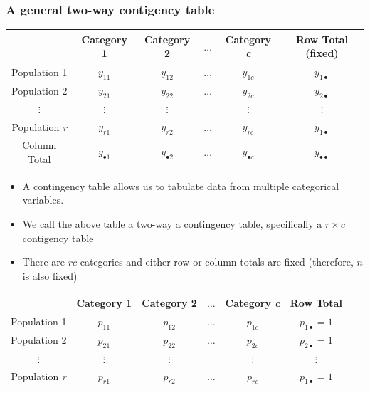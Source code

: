 \documentclass[a4paper]{article}
\begin{document}
\subsubsection{A general two-way contigency table}
\begin{table}[H]
	\centering
	\begin{tabular}{@{}cccccc@{}}
	\toprule
				 		  & Category 1   		& Category 2   		  & \( \dots \) & Category \textit{c} & Row Total (fixed)        \\ \midrule
	Population 1 		  & \( y_{11} \) 		& \( y_{12} \) 		  & \( \dots \) & \( y_{1c} \)        & \( y_{1 \bullet} \)      \\
	Population 2 		  & \( y_{21} \) 		& \( y_{22} \) 		  & \( \dots \) & \( y_{2c} \)        & \( y_{2 \bullet} \)      \\ 
	\( \vdots \) 		  & \( \vdots \) 		& \( \vdots \) 		  &             & \( \vdots \)        & \( \vdots \) 	         \\ 
	Population \textit{r} & \( y_{r1} \) 		& \( y_{r2} \) 		  & \( \dots \) & \( y_{rc} \)        & \( y_{1 \bullet} \)      \\ \midrule
	Column Total 		  & \( y_{\bullet 1} \) & \( y_{\bullet 2} \) & \( \dots \) & \( y_{\bullet c} \) & \( y_{\bullet\bullet} \) \\ \bottomrule
	\end{tabular}
\end{table}
\begin{itemize}
	\item A contingency table allows us to tabulate data from multiple categorical variables.
	\item We call the above table a two-way a contingency table, specifically a \( r \times c \) contigency table
	\item There are \( rc \) categories and either row or column totals are fixed (therefore, \( n \) is also fixed)
\end{itemize}
\begin{table}[H]
	\centering
	\begin{tabular}{@{}cccccc@{}}
	\toprule
				 		  & Category 1   					& Category 2   		  				& \( \dots \) & Category \textit{c}				  & Row Total               \\ \midrule
	Population 1 		  & \textcolor{myred}{\( p_{11} \)} & \textcolor{mygreen}{\( p_{12} \) }	& \( \dots \) & \textcolor{mygreen}{\( p_{1c} \)} & \( p_{1 \bullet} = 1 \) \\
	Population 2 		  & \textcolor{myred}{\( p_{21} \)} & \textcolor{mygreen}{\( p_{22} \) }	& \( \dots \) & \textcolor{mygreen}{\( p_{2c} \)} & \( p_{2 \bullet} = 1 \) \\ 
	\( \vdots \) 		  & \( \vdots \) 					& \( \vdots \) 		  				&             & \( \vdots \)        			  & \( \vdots \) 	        \\ 
	Population \textit{r} & \textcolor{myred}{\( p_{r1} \)} & \textcolor{mygreen}{\( p_{r2} \)} 	& \( \dots \) & \textcolor{mygreen}{\( p_{rc} \)} & \( p_{1 \bullet} = 1 \) \\ \bottomrule
	\end{tabular}
\end{table}
\end{document}

